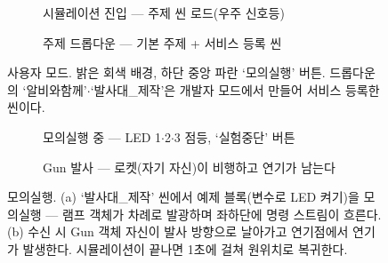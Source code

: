 \begin{figure}[htbp]\centering
  \begin{subfigure}{0.49\linewidth}\centering
    \caption{시뮬레이션 진입 --- 주제 씬 로드(우주 신호등)}
  \end{subfigure}\hfill
  \begin{subfigure}{0.49\linewidth}\centering
    \caption{주제 드롭다운 --- 기본 주제 + 서비스 등록 씬}
  \end{subfigure}
  \caption{사용자 모드. 밝은 회색 배경, 하단 중앙 파란 `모의실행' 버튼. 드롭다운의
  `알비와함께'$\cdot$`발사대\_제작'은 개발자 모드에서 만들어 서비스 등록한 씬이다.}
  \label{fig:simg-user}
\end{figure}

\begin{figure}[htbp]\centering
  \begin{subfigure}{0.49\linewidth}\centering
    \caption{모의실행 중 --- LED 1$\cdot$2$\cdot$3 점등, `실험중단' 버튼}
  \end{subfigure}\hfill
  \begin{subfigure}{0.49\linewidth}\centering
    \caption{Gun 발사 --- 로켓(자기 자신)이 비행하고 연기가 남는다}
  \end{subfigure}
  \caption{모의실행. (a) `발사대\_제작' 씬에서 예제 블록(변수로 LED 켜기)을 모의실행 ---
  램프 객체가 차례로 발광하며 좌하단에  명령
  스트림이 흐른다. (b)  수신 시 Gun 객체 자신이 발사 방향으로 날아가고
  연기점에서 연기가 발생한다. 시뮬레이션이 끝나면 1초에 걸쳐 원위치로 복귀한다.}
  \label{fig:simg-run}
\end{figure}

